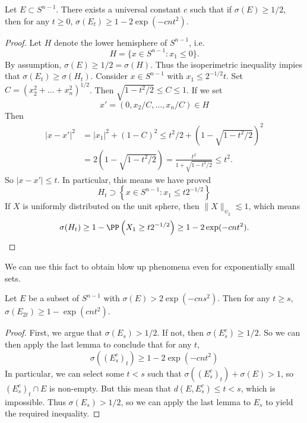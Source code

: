 \begin{lemma}
    Let $E \subset S^{n-1}$. There exists a universal constant $c$ such that if $\sigma(E) \geq 1/2$, then for any $t \geq 0$, $\sigma(E_t) \geq 1 - 2\exp(-cnt^2)$.
\end{lemma}
\begin{proof}
    Let $H$ denote the lower hemisphere of $S^{n-1}$, i.e.
    \[ H = \{ x \in S^{n-1} : x_1 \leq 0 \}. \]
    By assumption, $\sigma(E) \geq 1/2 = \sigma(H)$. Thus the isoperimetric inequality impies that $\sigma(E_t) \geq \sigma(H_t)$. Consider $x \in S^{n-1}$ with $x_1 \leq 2^{-1/2} t$. Set $C = (x_2^2 + \dots + x_n^2)^{1/2}$. Then $\sqrt{1 - t^2/2} \leq C \leq 1$. If we set
    \[ x' = \left( 0, x_2/C, \dots, x_n/C \right) \in H \]
    Then
    \begin{align*}
        |x - x'|^2 &= |x_1|^2 + (1 - C)^2 \leq t^2/2 + \left(1 - \sqrt{1 - t^2/2} \right)^2\\
        &= 2 \left(1 - \sqrt{1 - t^2/2} \right) = \frac{t^2}{1 + \sqrt{1 - t^2/2}} \leq t^2.
    \end{align*}
    So $|x - x'| \leq t$. In particular, this means we have proved
    \[ H_t \supset \left\{ x \in S^{n-1} : x_1 \leq t 2^{-1/2} \right\} \]
    If $X$ is uniformly distributed on the unit sphere, then $\| X \|_{\psi_2} \lesssim 1$, which means
    \[ \sigma(H_t) \geq 1 - \PP \left( X_1 \geq t 2^{-1/2} \right) \geq 1 - 2 \exp(-cn t^2). \qedhere \]
\end{proof}

We can use this fact to obtain blow up phenomena even for exponentially small sets.

\begin{lemma}
    Let $E$ be a subset of $S^{n-1}$ with $\sigma(E) > 2 \exp(-cns^2)$. Then for any $t \geq s$, $\sigma(E_{2t}) \geq 1 - \exp(cnt^2)$.
\end{lemma}
\begin{proof}
    First, we argue that $\sigma(E_s) > 1/2$. If not, then $\sigma(E_s^c) \geq 1/2$. So we can then apply the last lemma to conclude that for any $t$,
    \[ \sigma((E_s^c)_t) \geq 1 - 2 \exp(-cn t^2) \]
    In particular, we can select some $t < s$ such that $\sigma((E_s^c)_t) + \sigma(E) > 1$, so $(E_s^c)_t \cap E$ is non-empty. But this mean that $d(E,E_s^c) \leq t < s$, which is impossible. Thus $\sigma(E_s) > 1/2$, so we can apply the last lemma to $E_s$ to yield the required inequality.
\end{proof}

